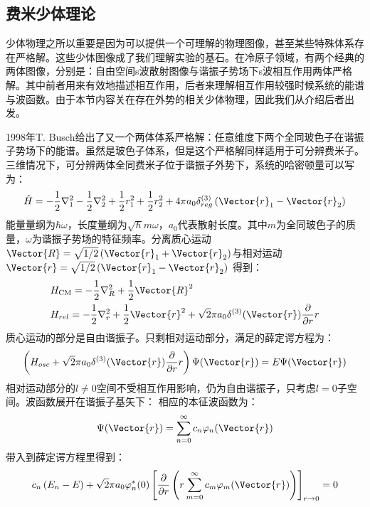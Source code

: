 \subsection{费米少体理论}
少体物理之所以重要是因为可以提供一个可理解的物理图像，甚至某些特殊体系存在严格解。这些少体图像成了我们理解实验的基石。在冷原子领域，有两个经典的两体图像，分别是：自由空间s波散射图像与谐振子势场下s波相互作用两体严格解。其中前者用来有效地描述相互作用，后者来理解相互作用较强时候系统的能谱与波函数。由于本节内容关在存在外势的相关少体物理，因此我们从介绍后者出发。

1998年T. Busch给出了又一个两体体系严格解\cite{busch1998two}：任意维度下两个全同玻色子在谐振子势场下的能谱。虽然是玻色子体系，但是这个严格解同样适用于可分辨费米子。三维情况下，可分辨两体全同费米子位于谐振子外势下，系统的哈密顿量可以写为：
\begin{equation}
\hat{H}=-\frac{1}{2} \nabla_{1}^{2}-\frac{1}{2} \nabla_{2}^{2}+\frac{1}{2} r_{1}^{2}+\frac{1}{2} r_{2}^{2}+4 \pi a_{0} \delta_{r e g}^{(3)}\left(\Vector{r}_{1}-\Vector{r}_{2}\right)
\end{equation}
能量量纲为$\hbar\omega$，长度量纲为$\sqrt{\hbar}{m\omega}$，$a_0$代表散射长度。其中$m$为全同玻色子的质量，$\omega$为谐振子势场的特征频率。分离质心运动$\Vector{R}=\sqrt{1 / 2}\left(\Vector{r}_{1}+\Vector{r}_{2}\right)$与相对运动$\Vector{r}=\sqrt{1 / 2}\left(\Vector{r}_{1}-\Vector{r}_{2}\right)$
得到：
\begin{equation}
\begin{aligned}
&H_{\mathrm{CM}}=-\frac{1}{2} \nabla_{R}^{2}+\frac{1}{2} \Vector{R}^{2}\\
&H_{r e l}=-\frac{1}{2} \nabla_{r}^{2}+\frac{1}{2} \Vector{r}^{2}+\sqrt{2} \pi a_{0} \delta^{(3)}(\Vector{r}) \frac{\partial}{\partial r} r\\
\end{aligned}
\end{equation}
质心运动的部分是自由谐振子。只剩相对运动部分，满足的薛定谔方程为：
\begin{equation}
\left(H_{o s c}+\sqrt{2} \pi a_{0} \delta^{(3)}(\Vector{r}) \frac{\partial}{\partial r} r\right) \Psi(\Vector{r})=E \Psi(\Vector{r})
\end{equation}
相对运动部分的$l\neq0$空间不受相互作用影响，仍为自由谐振子，只考虑$l=0$子空间。波函数展开在谐振子基矢下：
相应的本征波函数为：
\begin{equation}
\Psi(\Vector{r})=\sum_{n=0}^{\infty} c_{n} \varphi_{n}(\Vector{r})
\end{equation}
带入到薛定谔方程里得到：
\begin{equation}
c_{n}\left(E_{n}-E\right)+\sqrt{2} \pi a_{0} \varphi_{n}^{*}(0)\left[\frac{\partial}{\partial r}\left(r \sum_{m=0}^{\infty} c_{m} \varphi_{m}(\Vector{r})\right)\right]_{r \rightarrow 0}=0
\end{equation}
